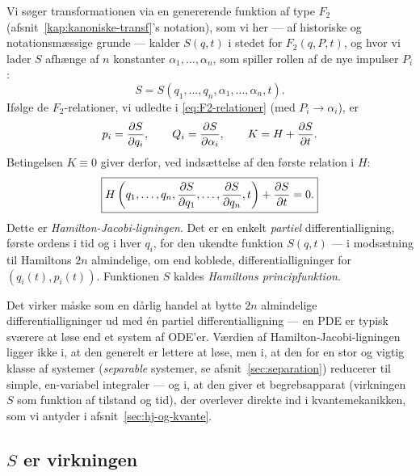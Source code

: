 Vi søger transformationen via en genererende funktion af type $F_2$
(afsnit~\ref{kap:kanoniske-transf}'s notation), som vi her — af
historiske og notationsmæssige grunde — kalder $S(q,t)$ i stedet for
$F_2(q,P,t)$, og hvor vi lader $S$ afhænge af $n$ konstanter
$\alpha_1,\dots,\alpha_n$, som spiller rollen af de nye impulser $P_i$:
\begin{equation}
  S = S(q_1,\dots,q_n,\alpha_1,\dots,\alpha_n,t).
\end{equation}
Ifølge de $F_2$-relationer, vi udledte i \eqref{eq:F2-relationer}
(med $P_i\to\alpha_i$), er
\begin{equation}
  p_i = \pdv{S}{q_i}, \qquad Q_i = \pdv{S}{\alpha_i}, \qquad K = H + \pdv{S}{t}.
  \label{eq:S-relationer}
\end{equation}
Betingelsen $K\equiv 0$ giver derfor, ved indsættelse af den første
relation i $H$:
\begin{equation}
  \boxed{H\left(q_1,\dots,q_n,\pdv{S}{q_1},\dots,\pdv{S}{q_n},t\right) + \pdv{S}{t} = 0.}
  \label{eq:hj-ligning}
\end{equation}
Dette er \emph{Hamilton-Jacobi-ligningen}. Det er en enkelt
\emph{partiel} differentialligning, første ordens i tid og i hver
$q_i$, for den ukendte funktion $S(q,t)$ — i modsætning til Hamiltons
$2n$ almindelige, om end koblede, differentialligninger for
$(q_i(t),p_i(t))$. Funktionen $S$ kaldes \emph{Hamiltons
principfunktion}.

\begin{bemaerkning}
Det virker måske som en dårlig handel at bytte $2n$ almindelige
differentialligninger ud med \'en partiel differentialligning — en
PDE er typisk sværere at løse end et system af ODE'er. Værdien af
Hamilton-Jacobi-ligningen ligger ikke i, at den generelt er lettere at
løse, men i, at den for en stor og vigtig klasse af systemer
(\emph{separable} systemer, se afsnit~\ref{sec:separation}) reducerer
til simple, en-variabel integraler — og i, at den giver et begrebsapparat
(virkningen $S$ som funktion af tilstand og tid), der overlever direkte
ind i kvantemekanikken, som vi antyder i afsnit~\ref{sec:hj-og-kvante}.
\end{bemaerkning}

\subsection{$S$ er virkningen}

